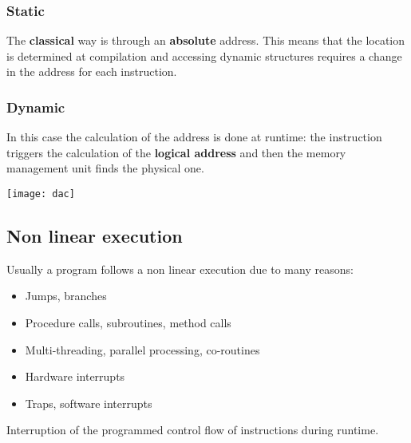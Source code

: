 \subsubsection{Static}
The \textbf{classical} way is through an \textbf{absolute} address. This means that the location is determined at compilation and accessing dynamic structures requires a change in the address for each instruction.
\subsubsection{Dynamic}
In this case the calculation of the address is done at runtime: the instruction triggers the calculation of the \textbf{logical address} and then the memory management unit finds the physical one.
\begin{center}
	\texttt{[image: dac]}
\end{center}

\newpage
\subsection{Non linear execution}
Usually a program follows a non linear execution due to many reasons:
\begin{itemize}
	\item Jumps, branches
	\item Procedure calls, subroutines, method calls
	\item Multi-threading, parallel processing, co-routines
	\item Hardware interrupts
	\item Traps, software interrupts
\end{itemize}

\begin{figure}[!h]
	\centering
	\hfill
	\hfill
	\hfill
\end{figure}

\begin{definition}[Exception]
	Interruption of the programmed control flow of instructions during runtime.
\end{definition}
